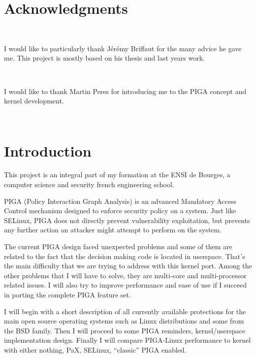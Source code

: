 \documentclass[pdftex,a4paper,titlepage,11pt]{article}
\begin{document}
\section*{Acknowledgments}

~

I would like to particularly thank Jérémy Briffaut for the many advice he gave me. This project is mostly based on his thesis and last years work.

~

I would like to thank Martin Peres for introducing me to the PIGA concept and kernel development.

~

\newpage

\tableofcontents

\newpage

\listoffigures

\newpage

\section*{Introduction} 

This project is an integral part of my formation at the ENSI de Bourges, a computer science and security french engineering school.

\bigskip

PIGA (Policy Interaction Graph Analysis) is an advanced Mandatory Access Control mechanism designed to enforce security policy on a system. Just like SELinux, PIGA does not directly prevent vulnerability exploitation, but prevents any further action an attacker might attempt to perform on the system.

\bigskip

The current PIGA design faced unexpected problems and some of them are related to the fact that the decision making code is located in userspace. That's the main difficulty that we are trying to address with this kernel port. Among the other problems that I will have to solve, they are multi-core and multi-processor related issues. I will also try to improve performance and ease of use if I succeed in porting the complete PIGA feature set.

\bigskip

I will begin with a short description of all currently available protections for the main open source operating systems such as Linux distributions and some from the BSD family. Then I will proceed to some PIGA reminders, kernel/userspace implementation design. Finally I will compare PIGA-Linux performance to kernel with either nothing, PaX, SELinux, ``classic'' PIGA enabled.
\end{document}
